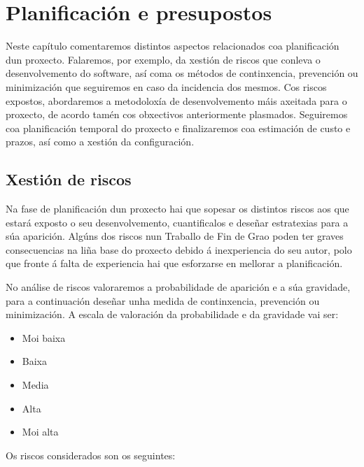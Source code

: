 \chapter{Planificación e presupostos}

Neste capítulo comentaremos distintos aspectos relacionados coa planificación dun proxecto. Falaremos, por exemplo, da xestión de riscos que conleva o desenvolvemento do software, así coma os métodos de continxencia, prevención ou minimización que seguiremos en caso da incidencia dos mesmos. Cos riscos expostos, abordaremos a metodoloxía de desenvolvemento máis axeitada para o proxecto, de acordo tamén cos obxectivos anteriormente plasmados. Seguiremos coa planificación temporal do proxecto e finalizaremos coa estimación de custo e prazos, así como a xestión da configuración. 

\section{Xestión de riscos}

Na fase de planificación dun proxecto hai que sopesar os distintos riscos aos que estará exposto o seu desenvolvemento, cuantificalos e deseñar estratexias para a súa aparición. Algúns dos riscos nun Traballo de Fin de Grao poden ter graves consecuencias na liña base do proxecto debido á inexperiencia do seu autor, polo que fronte á falta de experiencia hai que esforzarse en mellorar a planificación.

No análise de riscos valoraremos a probabilidade de aparición e a súa gravidade, para a continuación deseñar unha medida de continxencia, prevención ou minimización. A escala de valoración da probabilidade e da gravidade vai ser:

\begin{itemize}
\item Moi baixa
\item Baixa
\item Media
\item Alta
\item Moi alta
\end{itemize} 

Os riscos considerados son os seguintes:

